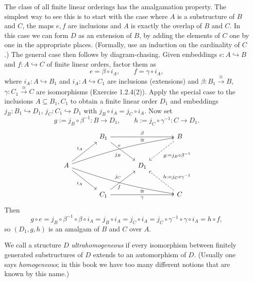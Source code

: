 The class of all finite linear orderings has the amalgamation property. The simplest way to see this is to start with the case where \( A \) is a substructure of \( B \) and \( C \), the maps \( e, f \) are inclusions and \( A \) is exactly the overlap of \( B \) and \( C \). In this case we can form \( D \) as an extension of \( B \), by adding the elements of \( C \) one by one in the appropriate places. (Formally, use an induction on the cardinality of \( C \).) The general case then follows by diagram-chasing.
Given embeddings \(e\colon A\hookrightarrow B\) and \(f\colon A\hookrightarrow C\) of finite linear orders, factor them as
\[
    e=\beta\circ i_A,\qquad f=\gamma\circ i_A,
\]
where \(i_A\colon A\hookrightarrow B_1\) and \(i_A\colon A\hookrightarrow C_1\) are inclusions (extensions) and \(\beta\colon B_1\xrightarrow{\ \cong\ }B\), \(\gamma\colon C_1\xrightarrow{\ \cong\ }C\) are isomorphisms (Exercise 1.2.4(2)). Apply the special case to the inclusions \(A\subseteq B_1,C_1\) to obtain a finite linear order \(D_1\) and embeddings \(j_B\colon B_1\hookrightarrow D_1\), \(j_C\colon C_1\hookrightarrow D_1\) with \(j_B\circ i_A=j_C\circ i_A\). Now set
\[
    g:=j_B\circ \beta^{-1}\colon B\to D_1,\qquad h:=j_C\circ \gamma^{-1}\colon C\to D_1.
\]
\[
    \begin{tikzcd}[column sep=large, row sep=large, ampersand replacement=\&]
        \& B_1 \arrow[rr, "\beta", "\cong"'] \arrow[dr, "j_B"'] \& \& B \arrow[dl, dashed, "g:=j_B\circ\beta^{-1}"] \\
        A \arrow[ur, "i_A"] \arrow[dr, "i_A"'] \arrow[urrr, bend left=5, "e"] \arrow[drrr, bend right=5, "f"'] \& \& D_1 \& \\
        \& C_1 \arrow[rr, "\gamma"', "\cong"] \arrow[ur, "j_C"] \& \& C \arrow[ul, dashed, "h:=j_C\circ\gamma^{-1}"']
    \end{tikzcd}
\]
Then
\[
    g\circ e=j_B\circ \beta^{-1}\circ \beta\circ i_A=j_B\circ i_A=j_C\circ i_A=j_C\circ \gamma^{-1}\circ \gamma\circ i_A=h\circ f,
\]
so \((D_1,g,h)\) is an amalgam of \(B\) and \(C\) over \(A\).



\begin{definition}[ultrahomogeneous]
    We call a structure \( D \) \emph{ultrahomogeneous} if every isomorphism between finitely generated substructures of \( D \) extends to an automorphism of \( D \). (Usually one says \emph{homogeneous}; in this book we have too many different notions that are known by this name.)
\end{definition}



